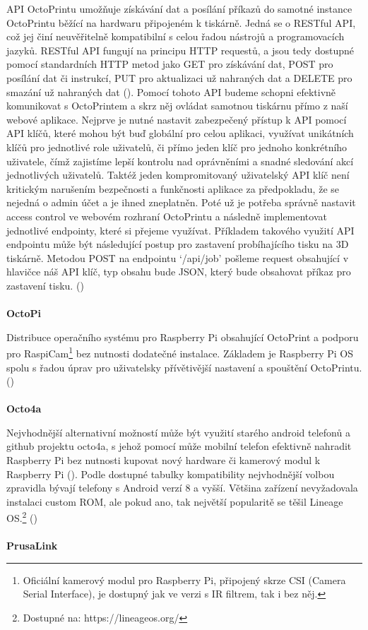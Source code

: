 \documentclass[twoside, 12pt]{article}
\begin{document}
API OctoPrintu umožňuje získávání dat a posílání příkazů do samotné instance OctoPrintu běžící na hardwaru připojeném k tiskárně. Jedná se o RESTful API, což jej činí neuvěřitelně kompatibilní s celou řadou nástrojů a programovacích jazyků. RESTful API fungují na principu HTTP requestů, a jsou tedy dostupné pomocí standardních HTTP metod jako GET pro získávání dat, POST pro posílání dat či instrukcí, PUT pro aktualizaci už nahraných dat a DELETE pro smazání už nahraných dat (\cite{OctoPrintApiHttp}). Pomocí tohoto API budeme schopni efektivně komunikovat s OctoPrintem a skrz něj ovládat samotnou tiskárnu přímo z naší webové aplikace. Nejprve je nutné nastavit zabezpečený přístup k API pomocí API klíčů, které mohou být buď globální pro celou aplikaci, využívat unikátních klíčů pro jednotlivé role uživatelů, či přímo jeden klíč pro jednoho konkrétního uživatele, čímž zajistíme lepší kontrolu nad oprávněními a snadné sledování akcí jednotlivých uživatelů. Taktéž jeden kompromitovaný uživatelský API klíč není kritickým narušením bezpečnosti a funkčnosti aplikace za předpokladu, že se nejedná o admin účet a je ihned zneplatněn. Poté už je potřeba správně nastavit access control ve webovém rozhraní OctoPrintu a následně implementovat jednotlivé endpointy, které si přejeme využívat. Příkladem takového využití API endpointu může být následující postup pro zastavení probíhajícího tisku na 3D tiskárně. Metodou POST na endpointu ‘/api/job’ pošleme request obsahující v hlavičce náš API klíč, typ obsahu bude JSON, který bude obsahovat příkaz pro zastavení tisku. (\cite{OctoPrintApiDocs})
\\
\\
\textbf{OctoPi}

Distribuce operačního systému pro Raspberry Pi obsahující OctoPrint a podporu pro RaspiCam\footnote{Oficiální kamerový modul pro Raspberry Pi, připojený skrze CSI (Camera Serial Interface), je dostupný jak ve verzi s IR filtrem, tak i bez něj.} bez nutnosti dodatečné instalace. Základem je Raspberry Pi OS spolu s řadou úprav pro uživatelsky přívětivější nastavení a spouštění OctoPrintu. (\cite{OctoPi})
\\
\\
\textbf{Octo4a}

Nejvhodnější alternativní možností může být využití starého android telefonů a github projektu octo4a, s jehož pomocí může mobilní telefon efektivně nahradit Raspberry Pi bez nutnosti kupovat nový hardware či kamerový modul k Raspberry Pi (\cite{octo4a}). Podle dostupné tabulky kompatibility nejvhodnější volbou zpravidla bývají telefony s Android verzí 8 a vyšší. Většina zařízení nevyžadovala instalaci custom ROM, ale pokud ano, tak největší popularitě se těšil Lineage OS.\footnote{Dostupné na: https://lineageos.org/} (\cite{octo4aCompatibility})
\\
\\
\textbf{PrusaLink}
\end{document}
